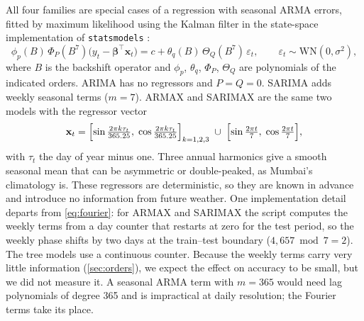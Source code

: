 \documentclass[11pt,a4paper]{article}
\newcommand{\code}[1]{\texttt{#1}}
\begin{document}
All four families are special cases of a regression with seasonal ARMA errors, fitted by maximum likelihood using the Kalman filter in the state-space implementation of \code{statsmodels} \citep{box2015time,seabold2010statsmodels}:
\begin{equation}
  \phi_p(B)\,\Phi_P(B^{7})\bigl(y_t - \bm\beta^{\top}\mathbf x_t\bigr) = c + \theta_q(B)\,\Theta_Q(B^{7})\,\varepsilon_t,
  \qquad \varepsilon_t \sim \mathrm{WN}(0,\sigma^2),
  \label{eq:sarimax}
\end{equation}
where $B$ is the backshift operator and $\phi_p$, $\theta_q$, $\Phi_P$, $\Theta_Q$ are polynomials of the indicated orders. ARIMA has no regressors and $P = Q = 0$. SARIMA adds weekly seasonal terms ($m = 7$). ARMAX and SARIMAX are the same two models with the regressor vector
\begin{equation}
  \mathbf x_t = \Bigl[\sin\tfrac{2\pi k\tau_t}{365.25},\; \cos\tfrac{2\pi k\tau_t}{365.25}\Bigr]_{k=1,2,3} \;\cup\; \Bigl[\sin\tfrac{2\pi t}{7},\; \cos\tfrac{2\pi t}{7}\Bigr],
  \label{eq:fourier}
\end{equation}
with $\tau_t$ the day of year minus one. Three annual harmonics give a smooth seasonal mean that can be asymmetric or double-peaked, as Mumbai's climatology is. These regressors are deterministic, so they are known in advance and introduce no information from future weather. One implementation detail departs from \cref{eq:fourier}: for ARMAX and SARIMAX the script computes the weekly terms from a day counter that restarts at zero for the test period, so the weekly phase shifts by two days at the train--test boundary ($4{,}657 \bmod 7 = 2$). The tree models use a continuous counter. Because the weekly terms carry very little information (\cref{sec:orders}), we expect the effect on accuracy to be small, but we did not measure it. A seasonal ARMA term with $m = 365$ would need lag polynomials of degree 365 and is impractical at daily resolution; the Fourier terms take its place.
\end{document}
